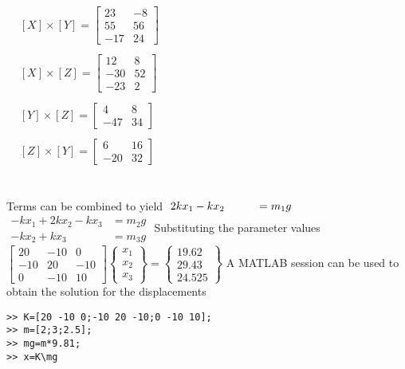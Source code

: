 \documentclass[../main.tex]{subfiles}
\begin{document}
\begin{enumerate}[label=\bfseries(\alph*)]
\section{}
$
\begin{aligned}
&{[X] \times[Y]=\left[\begin{array}{cc}
23 & -8 \\
55 & 56 \\
-17 & 24
\end{array}\right]} \\\\
&{[X] \times[Z]=\left[\begin{array}{cc}
12 & 8 \\
-30 & 52 \\
-23 & 2
\end{array}\right]} \\\\
&{[Y] \times[Z]=\left[\begin{array}{cc}
4 & 8 \\
-47 & 34
\end{array}\right]} \\\\
&{[Z] \times[Y]=\left[\begin{array}{cc}
6 & 16 \\
-20 & 32
\end{array}\right]}
\end{aligned}$
\bigbreak


\section{}
Terms can be combined to yield
\bigbreak
$\hspace*{0.1cm}2 k x_{1}-k x_{2} \hspace*{1cm}=m_{1} g$ \\
$
\begin{aligned}
-k x_{1}+2 k x_{2}-k x_{3} &=m_{2} g \\
-k x_{2}+k x_{3} &=m_{3} g
\end{aligned}$
\bigbreak
Substituting the parameter values
\bigbreak
$
\left[\begin{array}{ccc}
20 & -10 & 0 \\
-10 & 20 & -10 \\
0 & -10 & 10
\end{array}\right]\left\{\begin{array}{l}
x_{1} \\
x_{2} \\
x_{3}
\end{array}\right\}=\left\{\begin{array}{c}
19.62 \\
29.43 \\
24.525
\end{array}\right\}
$
\bigbreak
A MATLAB session can be used to obtain the solution for the displacements
\bigbreak
\begin{lstlisting}[numbers=none]
>> K=[20 -10 0;-10 20 -10;0 -10 10];
>> m=[2;3;2.5];
>> mg=m*9.81;
>> x=K\mg


\end{lstlisting}
\end{enumerate}
\end{document}
